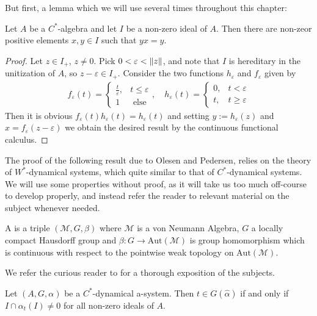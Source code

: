 But first, a lemma which we will use several times throughout this chapter:
\begin{lemma}
	Let $A$ be a $C^*$-algebra and let $I$ be a non-zero ideal of $A$. Then there are non-zeor positive elements $x,y \in I$ such that $yx = y$.
	\label{poselyx}
\end{lemma}
\begin{proof}
	Let $z \in I_+$, $z \neq 0$. Pick $0 < \varepsilon < \left\lVert z\right\rVert$, and note that $I$ is hereditary in the unitization of $A$, so $z-\varepsilon \in I_+$. Consider the two functions $h_\varepsilon$ and $f_{\varepsilon}$ given by
	\begin{align*}
		f_\varepsilon(t) = \begin{cases}
			\frac t \varepsilon, & t \leq \varepsilon\\
			1 & \text{ else}
		\end{cases}, \quad  h_\varepsilon(t) = \begin{cases}
			0, &  t < \varepsilon\\
			t, & t \geq \varepsilon
		\end{cases}
	\end{align*}
	Then it is obvious $f_\varepsilon(t) h_\varepsilon(t) = h_\varepsilon(t)$ and setting $y := h_\varepsilon(z)$ and $x = f_\varepsilon(z-\varepsilon)$ we obtain the desired result by the continuous functional calculus.
\end{proof}
\begin{remark}
	The proof of the following result due to Olesen and Pedersen, relies on the theory of $W^*$-dynamical systems, which quite similar to that of $C^*$-dynamical systems. We will use some properties without proof, as it will take us too much off-course to develop properly, and instead refer the reader to relevant material on the subject whenever needed.	
\begin{definition}
	A  is a triple $(\mathscr{M},G,\beta)$ where $\mathscr{M}$ is a von Neumann Algebra, $G$ a locally compact Hausdorff group and $\beta \colon G \to \mathrm{Aut}(\mathscr{M})$ is group homomorphism which is continuous with respect to the pointwise weak topology on $\mathrm{Aut}(\mathscr{M})$.
\end{definition}
	 We refer the curious reader to \cite[Chapter 7.4 and 7.10]{pedersenalgauto} for a thorough exposition of the subjects.
\end{remark}
\begin{proposition}
	Let $(A, G, \alpha)$ be a $C^*$-dynamical a-system. Then $t \in G(\hat \alpha)$ if and only if $I \cap \alpha_t(I) \neq 0$ for all non-zero ideals of $A$.
	\label{connesideal1}
\end{proposition}
